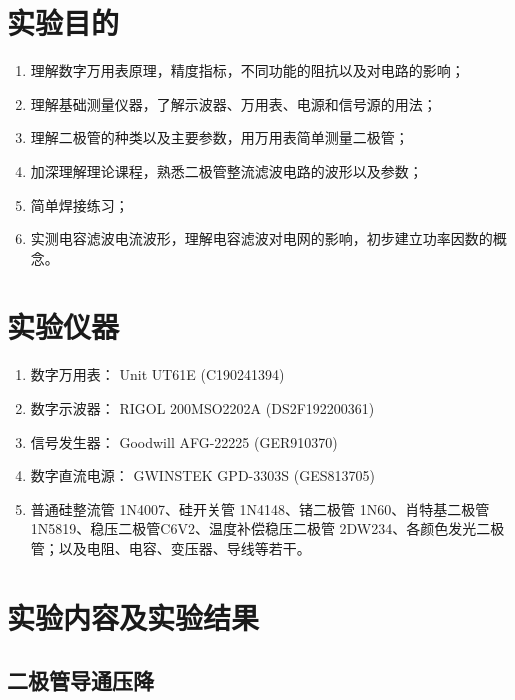 \documentclass[UTF8]{article}
\begin{document}

\section{实验目的}

\begin{enumerate}
    \item 理解数字万用表原理，精度指标，不同功能的阻抗以及对电路的影响；
    \item 理解基础测量仪器，了解示波器、万用表、电源和信号源的用法；
    \item 理解二极管的种类以及主要参数，用万用表简单测量二极管；
    \item 加深理解理论课程，熟悉二极管整流滤波电路的波形以及参数；
    \item 简单焊接练习；
    \item 实测电容滤波电流波形，理解电容滤波对电网的影响，初步建立功率因数的概念。
\end{enumerate}


\section{实验仪器}

\begin{enumerate}
    \item 数字万用表： Unit UT61E (C190241394)
    \item 数字示波器： RIGOL 200MSO2202A (DS2F192200361)
    \item 信号发生器： Goodwill AFG-22225 (GER910370)
    \item 数字直流电源： GWINSTEK GPD-3303S (GES813705)
    \item 普通硅整流管 1N4007、硅开关管 1N4148、锗二极管 1N60、肖特基二极管 1N5819、稳压二极管C6V2、温度补偿稳压二极管 2DW234、各颜色发光二极管；以及电阻、电容、变压器、导线等若干。
\end{enumerate}

\section{实验内容及实验结果}

\subsection{二极管导通压降}
\end{document}
